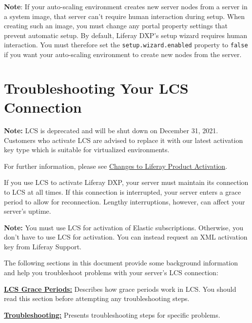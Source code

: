 \noindent\hrulefill

\textbf{Note}: If your auto-scaling environment creates new server nodes
from a server in a system image, that server can't require human
interaction during setup. When creating such an image, you must change
any portal property settings that prevent automatic setup. By default,
Liferay DXP's setup wizard requires human interaction. You must
therefore set the \texttt{setup.wizard.enabled} property to
\texttt{false} if you want your auto-scaling environment to create new
nodes from the server.

\chapter{Troubleshooting Your LCS
Connection}\label{troubleshooting-your-lcs-connection}

\noindent\hrulefill

\textbf{Note:} LCS is deprecated and will be shut down on December 31,
2021. Customers who activate LCS are advised to replace it with our
latest activation key type which is suitable for virtualized
environments.

For further information, please see
\href{https://help.liferay.com/hc/en-us/articles/4402347960845-Changes-to-Liferay-Product-Activation}{Changes
to Liferay Product Activation}.

\noindent\hrulefill

If you use LCS to activate Liferay DXP, your server must maintain its
connection to LCS at all times. If this connection is interrupted, your
server enters a grace period to allow for reconnection. Lengthy
interruptions, however, can affect your server's uptime.

\noindent\hrulefill

\textbf{Note:} You must use LCS for activation of Elastic subscriptions.
Otherwise, you don't have to use LCS for activation. You can instead
request an XML activation key from Liferay Support.

\noindent\hrulefill

The following sections in this document provide some background
information and help you troubleshoot problems with your server's LCS
connection:

\hyperref[lcs-grace-periods]{\textbf{LCS Grace Periods:}} Describes how
grace periods work in LCS. You should read this section before
attempting any troubleshooting steps.

\hyperref[troubleshooting]{\textbf{Troubleshooting:}} Presents
troubleshooting steps for specific problems.

